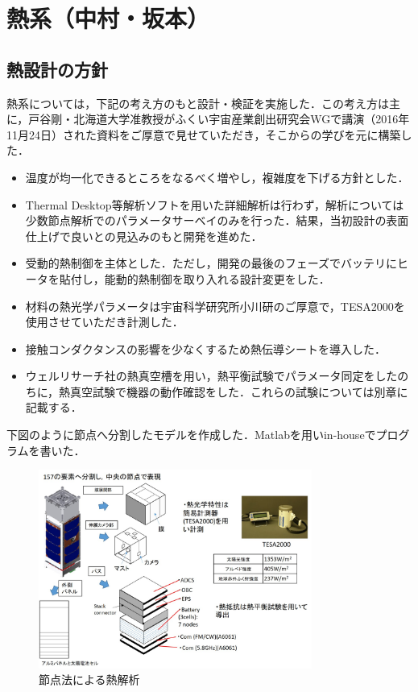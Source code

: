 \section{熱系（中村・坂本）}

\subsection{熱設計の方針}
熱系については，下記の考え方のもと設計・検証を実施した．この考え方は主に，戸谷剛・北海道大学准教授がふくい宇宙産業創出研究会WGで講演（2016年11月24日）された資料をご厚意で見せていただき，そこからの学びを元に構築した．
\begin{itemize}
	\item 温度が均一化できるところをなるべく増やし，複雑度を下げる方針とした．
	\item Thermal Desktop等解析ソフトを用いた詳細解析は行わず，解析については少数節点解析でのパラメータサーベイのみを行った．結果，当初設計の表面仕上げで良いとの見込みのもと開発を進めた．
	\item 受動的熱制御を主体とした．ただし，開発の最後のフェーズでバッテリにヒータを貼付し，能動的熱制御を取り入れる設計変更をした．
	\item 材料の熱光学パラメータは宇宙科学研究所小川研のご厚意で，TESA2000を使用させていただき計測した．
	\item 接触コンダクタンスの影響を少なくするため熱伝導シートを導入した．
	\item ウェルリサーチ社の熱真空槽を用い，熱平衡試験でパラメータ同定をしたのちに，熱真空試験で機器の動作確認をした．これらの試験については別章に記載する．
\end{itemize}

下図のように節点へ分割したモデルを作成した．Matlabを用いin-houseでプログラムを書いた．
\begin{figure}[H]
	\centering
	\includegraphics[width=0.8\textwidth]{03/fig/3-7-1.jpg}
	\caption{節点法による熱解析}
	\label{fig3-7-1}
\end{figure}

